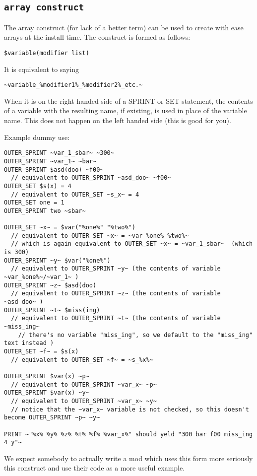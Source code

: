 \documentclass{article}
\def\DEFINE#1{{\tt \bf #1}\label{#1}\index{#1}}
\begin{document}
\subsection{\DEFINE{array construct}}

The array construct (for lack of a better term) can be used to create with
ease arrays at the install time. The construct is formed as follows:

\verb+$variable(modifier list)+

It is equivalent to saying

\verb+~variable_%modifier1%_%modifier2%_etc.~+

When it is on the right handed side of a SPRINT or SET statement, the contents of
a variable with the resulting name, if existing, is used in place of the variable name.
This does not happen on the left handed side (this is good for you).

Example dummy use:

\begin{verbatim}
OUTER_SPRINT ~var_1_sbar~ ~300~
OUTER_SPRINT ~var_1~ ~bar~
OUTER_SPRINT $asd(doo) ~f00~
  // equivalent to OUTER_SPRINT ~asd_doo~ ~f00~
OUTER_SET $s(x) = 4
  // equivalent to OUTER_SET ~s_x~ = 4
OUTER_SET one = 1
OUTER_SPRINT two ~sbar~

OUTER_SET ~x~ = $var("%one%" "%two%")
  // equivalent to OUTER_SET ~x~ = ~var_%one%_%two%~
  // which is again equivalent to OUTER_SET ~x~ = ~var_1_sbar~  (which is 300)
OUTER_SPRINT ~y~ $var("%one%")
  // equivalent to OUTER_SPRINT ~y~ (the contents of variable ~var_%one%~/~var_1~ )
OUTER_SPRINT ~z~ $asd(doo)
  // equivalent to OUTER_SPRINT ~z~ (the contents of variable ~asd_doo~ )
OUTER_SPRINT ~t~ $miss(ing)
  // equivalent to OUTER_SPRINT ~t~ (the contents of variable ~miss_ing~
	// there's no variable "miss_ing", so we default to the "miss_ing" text instead )
OUTER_SET ~f~ = $s(x)
  // equivalent to OUTER_SET ~f~ = ~s_%x%~

OUTER_SPRINT $var(x) ~p~
  // equivalent to OUTER_SPRINT ~var_x~ ~p~
OUTER_SPRINT $var(x) ~y~
  // equivalent to OUTER_SPRINT ~var_x~ ~y~
  // notice that the ~var_x~ variable is not checked, so this doesn't become OUTER_SPRINT ~p~ ~y~

PRINT ~"%x% %y% %z% %t% %f% %var_x%" should yeld "300 bar f00 miss_ing 4 y"~
\end{verbatim}

We expect somebody to actually write a mod which uses this form more seriously
this construct and use their code as a more useful example.
\end{document}
